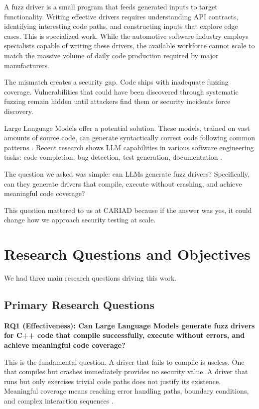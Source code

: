 A fuzz driver is a small program that feeds generated inputs to target functionality. Writing effective drivers requires understanding API contracts, identifying interesting code paths, and constructing inputs that explore edge cases. This is specialized work. While the automotive software industry employs specialists capable of writing these drivers, the available workforce cannot scale to match the massive volume of daily code production required by major manufacturers.

The mismatch creates a security gap. Code ships with inadequate fuzzing coverage. Vulnerabilities that could have been discovered through systematic fuzzing remain hidden until attackers find them or security incidents force discovery.

Large Language Models offer a potential solution. These models, trained on vast amounts of source code, can generate syntactically correct code following common patterns \cite{Touvron2023, Bai2023}. Recent research shows LLM capabilities in various software engineering tasks: code completion, bug detection, test generation, documentation \cite{TitanFuzz2022, Fuzz4All2023}.

The question we asked was simple: can LLMs generate fuzz drivers? Specifically, can they generate drivers that compile, execute without crashing, and achieve meaningful code coverage?

This question mattered to us at CARIAD because if the answer was yes, it could change how we approach security testing at scale.

\section{Research Questions and Objectives}
\label{sec:rq_objectives}

We had three main research questions driving this work.

\subsection{Primary Research Questions}
\label{sec:primary_rq}

\textbf{RQ1 (Effectiveness): Can Large Language Models generate fuzz drivers for C++ code that compile successfully, execute without errors, and achieve meaningful code coverage?}

This is the fundamental question. A driver that fails to compile is useless. One that compiles but crashes immediately provides no security value. A driver that runs but only exercises trivial code paths does not justify its existence. Meaningful coverage means reaching error handling paths, boundary conditions, and complex interaction sequences \cite{LLMDriverGenEffectiveness2023}.

